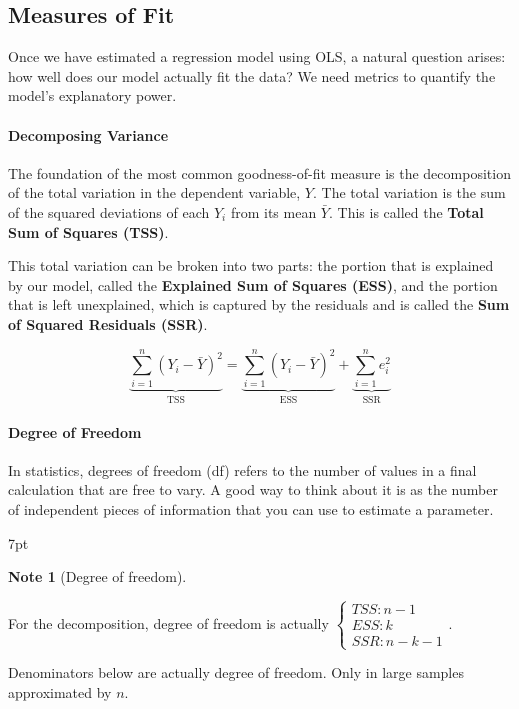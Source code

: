 \documentclass{article}
\newenvironment{blueblock}{
\def\FrameCommand{
  \hspace{1pt}
    {\color{DarkBlue}
    \vrule width 2pt}
    {\color{blueshade}
    \vrule width 4pt}
  \colorbox{blueshade}
}
\MakeFramed{
  \advance
  \hsize-
  \width
  \FrameRestore}
\noindent\hspace{-4.55pt}%
\begin{adjustwidth}{}{7pt}
\vspace{2pt}\vspace{2pt}
}
{\vspace{2pt}\end{adjustwidth}\endMakeFramed}
\newtheorem{note}{Note}
\begin{document}
\subsection{Measures of Fit}

Once we have estimated a regression model using OLS, a natural question arises: how well does our model actually fit the data? We need metrics to quantify the model's explanatory power.

\paragraph{Decomposing Variance}

The foundation of the most common goodness-of-fit measure is the decomposition of the total variation in the dependent variable, $Y$. The total variation is the sum of the squared deviations of each $Y_i$ from its mean $\bar Y$. This is called the \textbf{Total Sum of Squares (TSS)}.

This total variation can be broken into two parts: the portion that is explained by our model, called the \textbf{Explained Sum of Squares (ESS)}, and the portion that is left unexplained, which is captured by the residuals and is called the \textbf{Sum of Squared Residuals (SSR)}.

\begin{equation}
    \underbrace{\sum_{i=1}^n (Y_i - \bar Y)^2}_{\text{TSS}} = \underbrace{\sum_{i=1}^n (\hat Y_i - \bar Y)^2}_{\text{ESS}} + \underbrace{\sum_{i=1}^n e_i^2}_{\text{SSR}}
\end{equation}


\paragraph{Degree of Freedom} 

In statistics, degrees of freedom (df) refers to the number of values in a final calculation that are free to vary. A good way to think about it is as the number of independent pieces of information that you can use to estimate a parameter.

\begin{blueblock}
\begin{note}[Degree of freedom]
\end{note}
For the decomposition, degree of freedom is actually $\begin{cases}
 TSS: n-1\\
 ESS: k\\
 SSR: n-k-1
\end{cases}$.

Denominators below are actually degree of freedom. Only in large samples approximated by $n$.
\end{blueblock}
\end{document}
